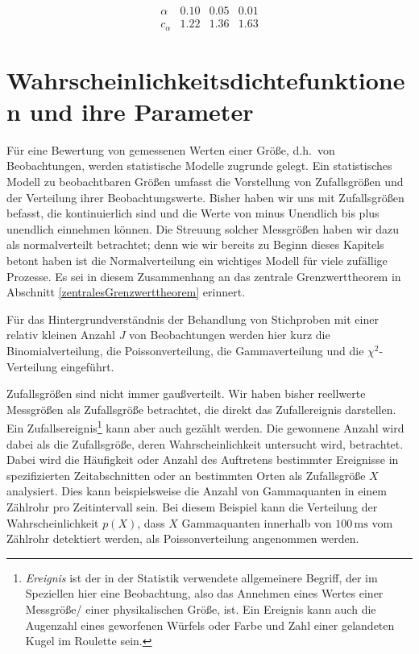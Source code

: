 $$
\begin{array}{c|ccc}
\alpha & 0.10 & 0.05 & 0.01\\
\hline
c_\alpha & 1.22 & 1.36 & 1.63
\end{array}
$$

%


\section{\label{wahrscheinlichkeitsverteilungen} Wahrscheinlichkeitsdichtefunktionen und ihre Parameter}

Für eine Bewertung von gemessenen Werten einer Größe, d.h.\ von Beobachtungen, werden
statistische Modelle zugrunde gelegt. Ein statistisches Modell zu beobachtbaren Größen
umfasst die Vorstellung von Zufallsgrößen und der Verteilung ihrer Beobachtungswerte.
Bisher haben wir uns mit Zufallsgrößen befasst, die kontinuierlich sind und die Werte von
minus Unendlich bis plus unendlich einnehmen können. Die Streuung solcher Messgrößen haben
wir dazu als normalverteilt betrachtet; denn wie wir bereits zu Beginn dieses Kapitels betont
haben ist die Normalverteilung ein wichtiges Modell für viele zufällige Prozesse. Es sei in
diesem Zusammenhang an das zentrale Grenzwerttheorem in
Abschnitt \ref{zentralesGrenzwerttheorem} erinnert.

Für das Hintergrundverständnis der Behandlung von Stichproben mit einer relativ kleinen Anzahl $J$ von
Beobachtungen werden hier kurz die Binomialverteilung, die Poissonverteilung, die Gammaverteilung
und die $\chi^2$-Verteilung eingeführt.

Zufallsgrößen sind nicht immer gaußverteilt.
Wir haben bisher reellwerte Messgrößen als Zufallsgröße betrachtet, die direkt das Zufallereignis darstellen.
Ein Zufallsereignis\footnote{\textsl{Ereignis}
 ist der in der Statistik verwendete
allgemeinere Begriff, der im Speziellen hier eine Beobachtung, also das Annehmen eines Wertes einer
Messgröße/ einer physikalischen Größe, ist.  Ein Ereignis kann auch die Augenzahl eines
geworfenen Würfels oder Farbe und Zahl einer gelandeten Kugel im Roulette sein.}
kann aber auch gezählt werden. Die gewonnene Anzahl wird dabei als die Zufallsgröße, deren
Wahrscheinlichkeit untersucht wird, betrachtet. Dabei wird die Häufigkeit oder Anzahl des
Auftretens bestimmter Ereignisse in spezifizierten Zeitabschnitten oder an bestimmten Orten
als Zufallsgröße $X$ analysiert. Dies kann beispielsweise die Anzahl von Gammaquanten in einem Zählrohr
pro Zeitintervall sein. Bei diesem Beispiel kann die Verteilung der Wahrscheinlichkeit $p(X)$, dass $X$
Gammaquanten innerhalb von $100 \, \mathrm{ms}$ vom Zählrohr detektiert werden,
als Poissonverteilung angenommen werden.

